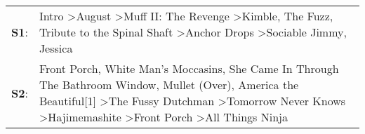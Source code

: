 \begin{supertabular}{p{0.03\textwidth}p{0.92\textwidth}}
 \textbf{S1}:  &                                                                                                                Intro\textsuperscript{} \textgreater \enspace August\textsuperscript{} \textgreater \enspace Muff II: The Revenge\textsuperscript{} \textgreater \enspace Kimble\textsuperscript{}, \enspace The Fuzz\textsuperscript{}, \enspace Tribute to the Spinal Shaft\textsuperscript{} \textgreater \enspace Anchor Drops\textsuperscript{} \textgreater \enspace Sociable Jimmy\textsuperscript{}, \enspace Jessica\textsuperscript{}  \enspace  \\
 \textbf{S2}:  &  Front Porch\textsuperscript{}, \enspace White Man's Moccasins\textsuperscript{}, \enspace She Came In Through The Bathroom Window\textsuperscript{}, \enspace Mullet (Over)\textsuperscript{}, \enspace America the Beautiful[1]\textsuperscript{} \textgreater \enspace The Fussy Dutchman\textsuperscript{} \textgreater \enspace Tomorrow Never Knows\textsuperscript{} \textgreater \enspace Hajimemashite\textsuperscript{} \textgreater \enspace Front Porch\textsuperscript{} \textgreater \enspace All Things Ninja\textsuperscript{}  \enspace  \\
\end{supertabular}
